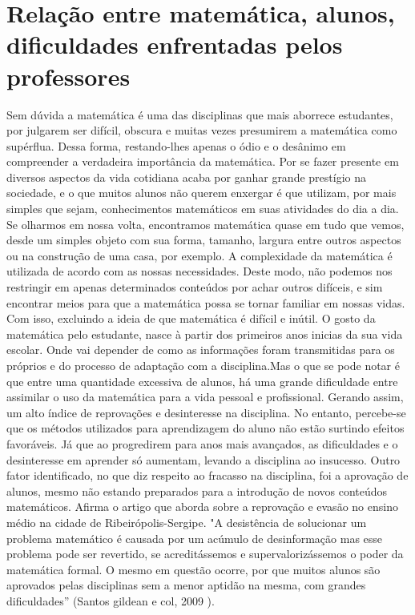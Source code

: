 \documentclass[12pt,a4paper]{article}
\begin{document}
\section{Relação entre matemática, alunos, dificuldades enfrentadas pelos professores}
Sem dúvida a matemática é uma das disciplinas que mais aborrece estudantes, por julgarem ser difícil, obscura e muitas vezes presumirem a matemática como supérflua. Dessa forma, restando-lhes apenas o ódio e o desânimo em compreender a verdadeira importância da matemática. 
Por se fazer presente em diversos aspectos da vida cotidiana acaba por ganhar grande prestígio na sociedade, e o que muitos alunos não querem enxergar é que utilizam, por mais simples que sejam, conhecimentos matemáticos em suas atividades do dia a dia. Se olharmos em nossa volta, encontramos matemática quase em tudo que vemos, desde um simples objeto com sua forma, tamanho, largura entre outros aspectos ou na construção de uma casa, por exemplo. 
A complexidade da matemática é utilizada de acordo com as nossas necessidades. Deste modo, não podemos nos restringir em apenas determinados conteúdos por achar outros difíceis, e sim encontrar meios para que a matemática possa se tornar familiar em nossas vidas. Com isso, excluindo a ideia de que matemática é difícil e inútil.
O gosto da matemática pelo estudante, nasce à partir dos primeiros anos inicias da sua vida escolar. Onde vai depender de como as informações foram transmitidas para os próprios e do processo de adaptação com a disciplina.Mas o que se pode notar é que entre uma quantidade excessiva de alunos, há uma grande dificuldade entre assimilar o uso da matemática para a vida pessoal e profissional. Gerando assim, um alto índice de reprovações e desinteresse na disciplina.
No entanto, percebe-se que os métodos utilizados para aprendizagem do aluno não estão surtindo efeitos favoráveis. Já que ao progredirem para anos mais avançados, as dificuldades e o desinteresse em aprender só aumentam, levando a disciplina ao insucesso.
Outro fator identificado, no que diz respeito ao fracasso na disciplina, foi a aprovação de alunos, mesmo não estando preparados para a introdução de novos conteúdos matemáticos. Afirma o artigo que aborda sobre a reprovação e evasão no ensino médio na cidade de Ribeirópolis-Sergipe.
"A desistência de solucionar um problema matemático é causada por um acúmulo de desinformação mas esse problema pode ser revertido, se acreditássemos e supervalorizássemos o poder da matemática formal. O mesmo em questão ocorre, por que muitos alunos são aprovados pelas disciplinas sem a menor aptidão na mesma, com grandes dificuldades” (Santos gildean e col, 2009 ).
\end{document}
